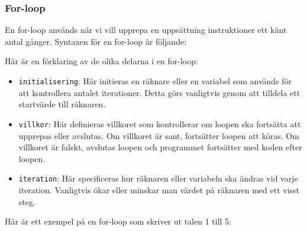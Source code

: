 \hypertarget{for-loop}{%
\subsubsection{For-loop}\label{for-loop}}

En for-loop används när vi vill upprepa en uppsättning instruktioner ett
känt antal gånger. Syntaxen för en for-loop är följande:

\hypertarget{cb1}{}
\begin{Shaded}
\begin{Highlighting}[]
 \OperatorTok{(}\OperatorTok{;}\OperatorTok{;}\OperatorTok{)} \OperatorTok{\{}
\OperatorTok{\}}
\end{Highlighting}
\end{Shaded}

Här är en förklaring av de olika delarna i en for-loop:

\begin{itemize}
\tightlist
\item
  \texttt{initialisering}: Här initieras en räknare eller en variabel
  som används för att kontrollera antalet iterationer. Detta görs
  vanligtvis genom att tilldela ett startvärde till räknaren.
\item
  \texttt{villkor}: Här definieras villkoret som kontrollerar om loopen
  ska fortsätta att upprepas eller avslutas. Om villkoret är sant,
  fortsätter loopen att köras. Om villkoret är falskt, avslutas loopen
  och programmet fortsätter med koden efter loopen.
\item
  \texttt{iteration}: Här specificeras hur räknaren eller variabeln ska
  ändras vid varje iteration. Vanligtvis ökar eller minskar man värdet
  på räknaren med ett visst steg.
\end{itemize}

Här är ett exempel på en for-loop som skriver ut talen 1 till 5:

\hypertarget{cb2}{}
\begin{Shaded}
\begin{Highlighting}[]
 \OperatorTok{(}\OperatorTok{=} \OperatorTok{;}\OperatorTok{\textless{}=} \OperatorTok{;}\OperatorTok{++)} \OperatorTok{\{}
    \OperatorTok{(}\OperatorTok{);}
\OperatorTok{\}}
\end{Highlighting}
\end{Shaded}


